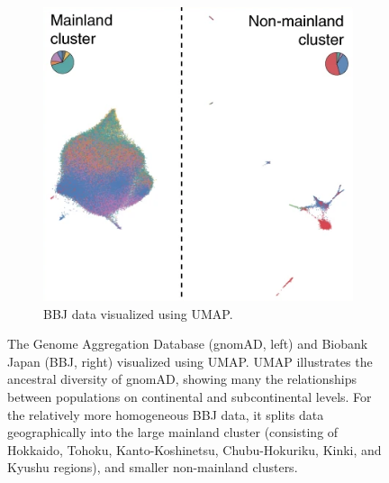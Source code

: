 \documentclass[12pt]{article}
\begin{document}
\begin{figure}[h!]
\begin{subfigure}[b]{0.49\linewidth}
    \includegraphics[width=\linewidth]{external_images/BBJ_UMAP.png}
    \caption{BBJ data visualized using UMAP.}
    \label{fig:BBJ_UMAP}
  \end{subfigure}
  \caption{The Genome Aggregation Database (gnomAD, left) and Biobank Japan (BBJ, right) visualized using UMAP. UMAP illustrates the ancestral diversity of gnomAD, showing many the relationships between populations on continental and subcontinental levels. For the relatively more homogeneous BBJ data, it splits data geographically into the large mainland cluster (consisting of Hokkaido, Tohoku, Kanto-Koshinetsu, Chubu-Hokuriku, Kinki, and Kyushu regions), and smaller non-mainland clusters.}
  \label{fig:external_UMAP}
\end{figure}


\clearpage
\end{document}
